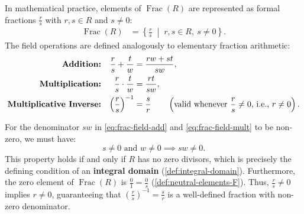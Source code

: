 \begin{content}

In mathematical practice, elements of $\operatorname{Frac}(R)$ are represented as formal fractions $\frac{r}{s}$ with $r, s \in R$ and $s \neq 0$:
\begin{align}
    \operatorname{Frac}(R) &= \left\{ \frac{r}{s} \;\middle|\; r, s \in R, \ s \neq 0 \right\}. \label{eq:frac-field-elements}
\end{align}
The field operations are defined analogously to elementary fraction arithmetic:
\begin{align}
    \text{\textbf{Addition:}} && \frac{r}{s} + \frac{t}{w} &= \frac{rw + st}{sw}, \label{eq:frac-field-add} \\
    \text{\textbf{Multiplication:}} && \frac{r}{s} \cdot \frac{t}{w} &= \frac{rt}{sw}, \label{eq:frac-field-mult} \\
    \text{\textbf{Multiplicative Inverse:}} && \left( \frac{r}{s} \right)^{-1} &= \frac{s}{r} \qquad \left(\text{valid whenever } \frac{r}{s} \neq 0 \text{, i.e., } r \neq 0\right). \label{eq:frac-field-inv}
\end{align}

\begin{steps}
For the denominator $sw$ in \eqref{eq:frac-field-add} and \eqref{eq:frac-field-mult} to be non-zero, we must have:
\[
s \neq 0 \text{ and } w \neq 0 \implies sw \neq 0.
\]
This property holds if and only if $R$ has no zero divisors, which is precisely the defining condition of an \textbf{integral domain} (\cref{def:integral-domain}). Furthermore, the zero element of $\operatorname{Frac}(R)$ is $\frac{0}{1} = \frac{0}{s}$ (\cref{def:neutral-elements-F}). Thus, $\frac{r}{s} \neq 0$ implies $r \neq 0$, guaranteeing that $\left(\frac{r}{s}\right)^{-1} = \frac{s}{r}$ is a well-defined fraction with non-zero denominator.
\end{steps}
\end{content}

